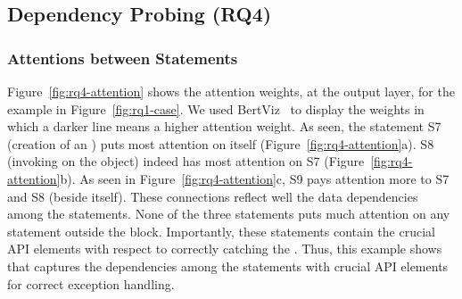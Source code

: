 \subsection{Dependency Probing (RQ4)}
\label{sec:rq4}


\subsubsection{Attentions between Statements}
Figure~\ref{fig:rq4-attention} shows the attention weights, at the
output layer, for the example in Figure~\ref{fig:rq1-case}. We used
BertViz~\cite{bertviz} to display the weights in which a darker line
means a higher attention weight. As seen, the statement S7 (creation
of an ) puts most attention on itself
(Figure~\ref{fig:rq4-attention}a). S8 (invoking 
on the  object) indeed has most attention on S7
(Figure~\ref{fig:rq4-attention}b). As seen in
Figure~\ref{fig:rq4-attention}c, S9 pays attention more to S7 and S8
(beside itself). These connections reflect well the data dependencies
among the statements. None of the three statements puts much attention
on any statement outside the  block. Importantly, these
statements contain the crucial API elements with respect to correctly catching
the . Thus, this example shows that {\tool} captures
the dependencies among the statements with crucial API elements for
correct exception handling.


